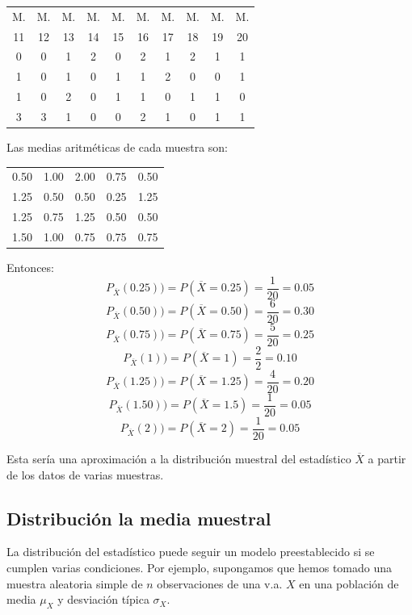 \documentclass[12pt]{report}
\begin{document}
\begin{center}
     \begin{tabular}{c|c|c|c|c|c|c|c|c|c}
     M. & M. & M. & M. & M. & M. & M. & M. & M. & M.\\
11 & 12 & 13 & 14 & 15 & 16 & 17 & 18 &  19 & 20 \\
 \hline
0&0&1&2&0&2&1&2&1&1\\ 1&0&1&0&1&1&2&0&0&1\\ 1&0&2&0&1&1&0&1&1&0\\ 3&3&1&0&0&2&1&0&1&1
\end{tabular}
\end{center}



Las medias aritméticas de cada muestra son:

\begin{center}

\begin{tabular}{ccccc}
 0.50&1.00&2.00&0.75&0.50\\
 1.25&0.50&0.50&0.25&1.25\\
 1.25&0.75&1.25&0.50&0.50\\
 1.50&1.00&0.75&0.75&0.75
  \end{tabular}
  \end{center}

  Entonces:
  $$P_{\overline{X}}(0.25))=P(\overline{X}=0.25)=\frac{1}{20}=0.05$$
  $$P_{\overline{X}}(0.50))=P(\overline{X}=0.50)=\frac{6}{20}=0.30$$
  $$P_{\overline{X}}(0.75))=P(\overline{X}=0.75)=\frac{5}{20}=0.25$$
  $$P_{\overline{X}}(1))=P(\overline{X}=1)=\frac{2}{2}=0.10$$
  $$P_{\overline{X}}(1.25))=P(\overline{X}=1.25)=\frac{4}{20}=0.20$$
  $$P_{\overline{X}}(1.50))=P(\overline{X}=1.5)=\frac{1}{20}=0.05$$
  $$P_{\overline{X}}(2))=P(\overline{X}=2)=\frac{1}{20}=0.05$$

   Esta sería una aproximación a la distribución muestral del
   estadístico $\overline{X}$ a partir de los datos de varias
   muestras.


 \subsection{Distribución  la media muestral}
 La distribución del estadístico puede seguir un modelo preestablecido si se cumplen varias condiciones. Por ejemplo,
 supongamos que hemos tomado una muestra aleatoria simple de $n$ observaciones
 de una v.a. $X$ en una población de media $\mu_{X}$ y desviación típica $\sigma_{X}$.
\end{document}
